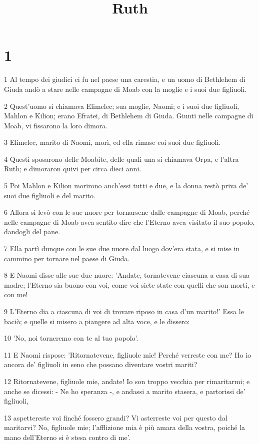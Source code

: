 

\title{Ruth}


\chapter{1}

\par 1 Al tempo dei giudici ci fu nel paese una carestia, e un uomo di Bethlehem di Giuda andò a stare nelle campagne di Moab con la moglie e i suoi due figliuoli.
\par 2 Quest'uomo si chiamava Elimelec; sua moglie, Naomi; e i suoi due figliuoli, Mahlon e Kilion; erano Efratei, di Bethlehem di Giuda. Giunti nelle campagne di Moab, vi fissarono la loro dimora.
\par 3 Elimelec, marito di Naomi, morì, ed ella rimase coi suoi due figliuoli.
\par 4 Questi sposarono delle Moabite, delle quali una si chiamava Orpa, e l'altra Ruth; e dimoraron quivi per circa dieci anni.
\par 5 Poi Mahlon e Kilion morirono anch'essi tutti e due, e la donna restò priva de' suoi due figliuoli e del marito.
\par 6 Allora si levò con le sue nuore per tornarsene dalle campagne di Moab, perché nelle campagne di Moab avea sentito dire che l'Eterno avea visitato il suo popolo, dandogli del pane.
\par 7 Ella partì dunque con le sue due nuore dal luogo dov'era stata, e si mise in cammino per tornare nel paese di Giuda.
\par 8 E Naomi disse alle sue due nuore: 'Andate, tornatevene ciascuna a casa di sua madre; l'Eterno sia buono con voi, come voi siete state con quelli che son morti, e con me!
\par 9 L'Eterno dia a ciascuna di voi di trovare riposo in casa d'un marito!' Essa le baciò; e quelle si misero a piangere ad alta voce, e le dissero:
\par 10 'No, noi torneremo con te al tuo popolo'.
\par 11 E Naomi rispose: 'Ritornatevene, figliuole mie! Perché verreste con me? Ho io ancora de' figliuoli in seno che possano diventare vostri mariti?
\par 12 Ritornatevene, figliuole mie, andate! Io son troppo vecchia per rimaritarmi; e anche se dicessi: - Ne ho speranza -, e andassi a marito stasera, e partorissi de' figliuoli,
\par 13 aspettereste voi finché fossero grandi? Vi asterreste voi per questo dal maritarvi? No, figliuole mie; l'afflizione mia è più amara della vostra, poiché la mano dell'Eterno si è stesa contro di me'.
